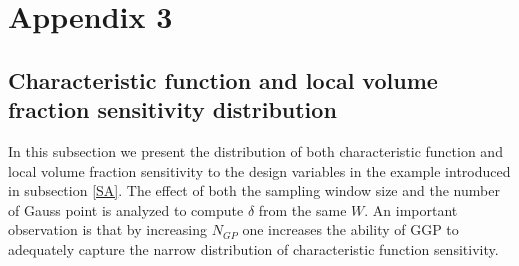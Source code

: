 \chapter{Appendix 3}
\section{Characteristic function and local volume fraction sensitivity distribution}
In this subsection we present the distribution of both characteristic function and local volume fraction sensitivity to the design variables in the example introduced in subsection \ref{SA}. The effect of both the sampling window size and the number of Gauss point is analyzed to compute $\delta$ from the same $W$.
An important observation is that by increasing $N_{GP}$ one increases the ability of GGP to adequately capture the narrow distribution of characteristic function sensitivity.
